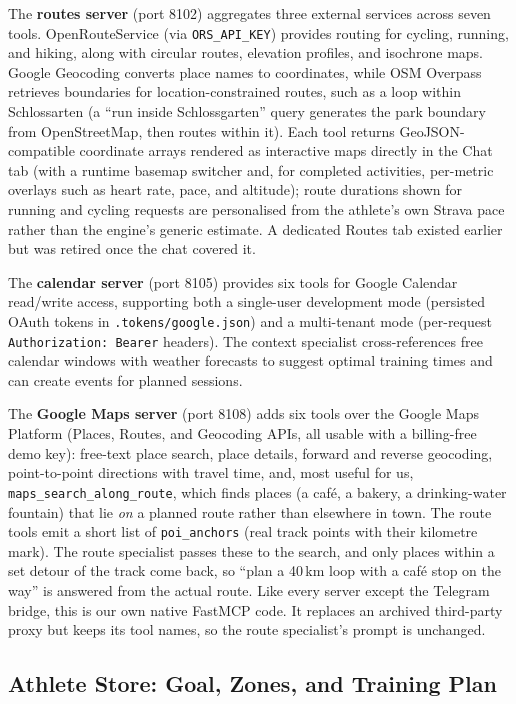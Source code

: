 The \textbf{routes server} (port 8102) aggregates three external services across seven tools. OpenRouteService (via \texttt{ORS\_API\_KEY}) provides routing for cycling, running, and hiking, along with circular routes, elevation profiles, and isochrone maps. Google Geocoding converts place names to coordinates, while OSM Overpass retrieves boundaries for location-constrained routes, such as a loop within Schlossarten (a ``run inside Schlossgarten'' query generates the park boundary from OpenStreetMap, then routes within it). Each tool returns GeoJSON-compatible coordinate arrays rendered as interactive maps directly in the Chat tab (with a runtime basemap switcher and, for completed activities, per-metric overlays such as heart rate, pace, and altitude); route durations shown for running and cycling requests are personalised from the athlete's own Strava pace rather than the engine's generic estimate. A dedicated Routes tab existed earlier but was retired once the chat covered it.

The \textbf{calendar server} (port 8105) provides six tools for Google Calendar read/write access, supporting both a single-user development mode (persisted OAuth tokens in \texttt{.tokens/google.json}) and a multi-tenant mode (per-request \texttt{Authorization: Bearer} headers). The context specialist cross-references free calendar windows with weather forecasts to suggest optimal training times and can create events for planned sessions.

The \textbf{Google Maps server} (port 8108) adds six tools over the Google Maps Platform (Places, Routes, and Geocoding APIs, all usable with a billing-free demo key): free-text place search, place details, forward and reverse geocoding, point-to-point directions with travel time, and, most useful for us, \texttt{maps\_search\_along\_route}, which finds places (a caf\'e, a bakery, a drinking-water fountain) that lie \textit{on} a planned route rather than elsewhere in town. The route tools emit a short list of \texttt{poi\_anchors} (real track points with their kilometre mark). The route specialist passes these to the search, and only places within a set detour of the track come back, so ``plan a 40\,km loop with a caf\'e stop on the way'' is answered from the actual route. Like every server except the Telegram bridge, this is our own native FastMCP code. It replaces an archived third-party proxy but keeps its tool names, so the route specialist's prompt is unchanged.

\subsection{Athlete Store: Goal, Zones, and Training Plan}\label{sec:data:athlete}

